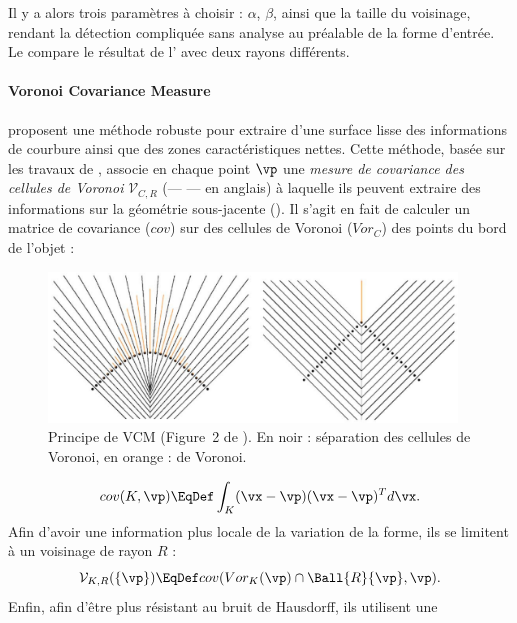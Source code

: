 %
Il y a alors trois paramètres à choisir : $\alpha$, $\beta$, ainsi que la
taille du voisinage, rendant la détection compliquée sans analyse au préalable
de la forme d'entrée. Le  compare le résultat de l' avec deux rayons différents.
%
\paragraph{Voronoi Covariance Measure}
%
 proposent une méthode robuste pour extraire
d'une surface lisse des informations de courbure ainsi que des zones
caractéristiques nettes. Cette méthode, basée sur les travaux de
, associe en chaque point $\vp$ une \emph{mesure de
covariance des cellules de Voronoi} $\mathcal{V}_{C,R}$ (\VCMM --- \VCM --- en
anglais) à laquelle ils peuvent extraire des informations sur la géométrie
sous-jacente (). Il s'agit en fait de calculer un matrice de covariance ($cov$) sur des
cellules de Voronoi ($Vor_C$) des points du bord de l'objet :
%
\begin{figure}[ht]{
    \begin{center}
    \includegraphics[height=4cm]{images/Feature/VCM}
    \end{center}}
    \caption[Notations.]{Principe de VCM (Figure~2 de \cite{Merigot2011}). En noir : séparation des cellules de Voronoi, en orange :  de Voronoi.
      \label{fig:mellado-VCM}}
\end{figure}
%
\begin{equation}
    cov(K,\vp) \EqDef \int_K (\vx - \vp)(\vx - \vp)^T d\vx .
\end{equation}
%
Afin d'avoir une information plus locale de la variation de la forme, ils se
limitent à un voisinage de rayon $R$ :
%
\begin{equation}
  \mathcal{V}_{K,R}(\{\vp\}) \EqDef cov(Vor_K(\vp) \cap \Ball{R}{\vp}, \vp) .
\end{equation}
%
Enfin, afin d'être plus résistant au bruit de Hausdorff, ils utilisent une
